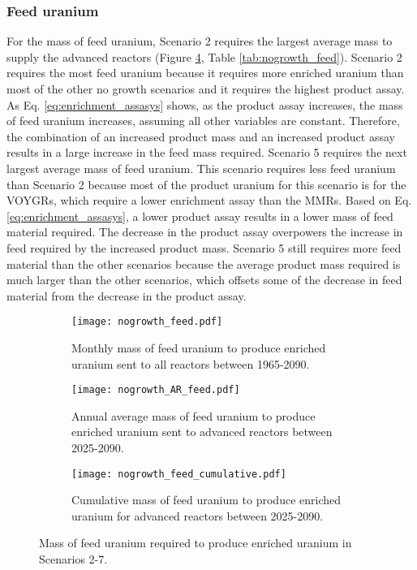 \subsubsection{Feed uranium}
For the mass of feed uranium, Scenario 2 requires the largest average mass 
to supply the advanced reactors (Figure \ref{fig:nogrowth_feed}, Table 
\ref{tab:nogrowth_feed}). Scenario 2 requires the most feed uranium 
because it requires more enriched uranium than most 
of the other no growth scenarios and it requires the highest product 
assay. As Eq. \ref{eq:enrichment_assasys} shows, as the product assay 
increases, the mass of feed uranium increases, assuming all other 
variables are constant. Therefore, the combination of an increased product 
mass and an increased product assay results in a large increase in the feed 
mass required. Scenario 5 requires the next largest average 
mass of feed uranium. This scenario requires less feed uranium than Scenario 2 
because 
most of the product uranium for this scenario is for the VOYGRs, which 
require a lower enrichment assay than the \glspl{MMR}. Based on Eq. 
\ref{eq:enrichment_assasys}, a lower product assay results in 
a lower mass of feed material required. The decrease in the product 
assay overpowers the increase in feed required by the increased product mass. 
Scenario 5 still requires more feed 
material than the other scenarios because the average product mass required 
is much larger than the other scenarios, which offsets some of the decrease 
in feed material from the decrease in the product assay. 

\begin{figure}[h!]
    \centering
    \begin{subfigure}[b]{0.45\textwidth}
        \centering
        \texttt{[image: nogrowth\_feed.pdf]}
        \caption{Monthly mass of feed uranium to produce enriched uranium sent to 
        all reactors between 1965-2090.}
        \label{fig:nogrowth_all_feed}
    \end{subfigure}
    \hfill
    \begin{subfigure}[b]{0.45\textwidth}
        \centering
        \texttt{[image: nogrowth\_AR\_feed.pdf]}
        \caption{Annual average mass of feed uranium to produce enriched uranium sent to 
        advanced reactors between 2025-2090.}
        \label{fig:nogrowth_AR_feed}
    \end{subfigure}
    \begin{subfigure}[b]{0.45\textwidth}
        \centering
        \texttt{[image: nogrowth\_feed\_cumulative.pdf]}
        \caption{Cumulative mass of feed uranium to produce enriched 
        uranium for advanced reactors between 2025-2090.}
        \label{fig:nogrowth_feed_cumulative}
    \end{subfigure}
       \caption{Mass of feed uranium required to produce enriched uranium
        in Scenarios 2-7.}
       \label{fig:nogrowth_feed}
\end{figure}

